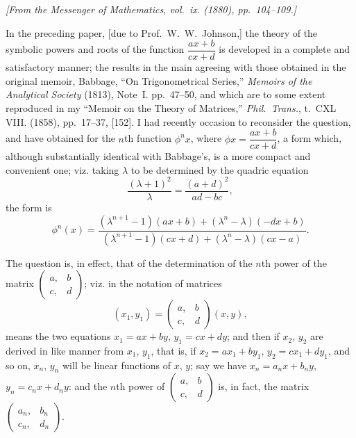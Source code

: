 \documentclass[12pt,a4paper]{article}
\begin{document}
\begin{flushright}
\textit{[From the Messenger of Mathematics, vol.~ix. (1880), pp.~104--109.]}
\end{flushright}

In the preceding paper, [due to Prof.~W.~W.~Johnson,] the theory of the symbolic
powers and roots of the function $\dfrac{ax+b}{cx+d}$ is developed in a complete and satisfactory
manner; the results in the main agreeing with those obtained in the original memoir,
Babbage, ``On Trigonometrical Series,'' \textit{Memoirs of the Analytical Society} (1813), Note~I.
pp.~47--50, and which are to some extent reproduced in my ``Memoir on the Theory
of Matrices,'' \textit{Phil.\ Trans.}, t.~CXL VIII. (1858), pp.~17--37, [152]. I had recently
occasion to reconsider the question, and have obtained for the $n$th function $\phi^n x$, where
$\phi x = \dfrac{ax+b}{cx+d}$, a form which, although substantially identical with Babbage's, is a more
compact and convenient one; viz. taking $\lambda$ to be determined by the quadric equation
%
\[
\frac{(\lambda + 1)^2}{\lambda} = \frac{(a+d)^2}{ad-bc},
\]
%
the form is
%
\[
\phi^n(x) = \frac{(\lambda^{n+1} - 1)(ax+b) + (\lambda^n - \lambda)(-dx+b)}
{(\lambda^{n+1} - 1)(cx+d) + (\lambda^n - \lambda)(cx-a)}.
\]

The question is, in effect, that of the determination of the $n$th power of the
matrix $\left(\begin{array}{c|c} a, & b \\ \hline c, & d \end{array}\right)$; viz. in the notation of matrices
%
\[
(x_1, y_1) = \left(\begin{array}{c|c} a, & b \\ \hline c, & d \end{array}\right) (x, y),
\]
%
means the two equations $x_1 = ax + by$, $y_1 = cx + dy$; and then if $x_2$, $y_2$ are derived in
like manner from $x_1$, $y_1$, that is, if $x_2 = ax_1 + by_1$, $y_2 = cx_1 + dy_1$, and so on,
$x_n$, $y_n$ will be linear functions of $x$, $y$; say we have $x_n = a_n x + b_n y$,
$y_n = c_n x + d_n y$: and the $n$th power of $\left(\begin{array}{c|c} a, & b \\ \hline c, & d \end{array}\right)$
is, in fact, the matrix $\left(\begin{array}{c|c} a_n, & b_n \\ \hline c_n, & d_n \end{array}\right)$.
\end{document}
